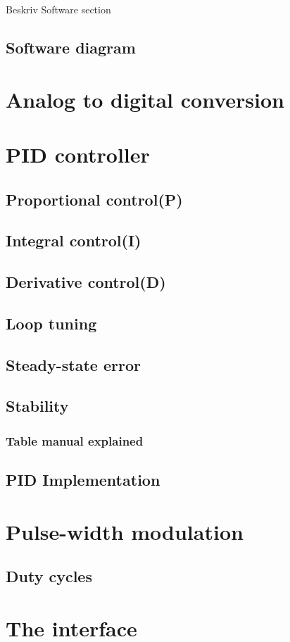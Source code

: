 
Beskriv Software section

\subsection{Software diagram}

\section{Analog to digital conversion}

\section{PID controller} 

\subsection {Proportional control(P)}

\subsection {Integral control(I)}

\subsection {Derivative control(D)} 

\subsection {Loop tuning} 

\subsection {Steady-state error}

\subsection {Stability} 

\subsubsection {Table manual explained}

\subsection{PID Implementation}

\section{Pulse-width modulation}

\subsection{Duty cycles}

\section{The interface}
